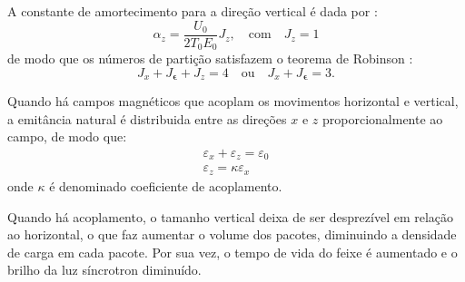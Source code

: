 A constante de amortecimento para a direção vertical é dada por \cite{Sands}:
\begin{equation}
 \alpha_z = \frac{U_0}{2T_0 E_0}J_z , \quad \text{com} \quad J_z = 1
\end{equation}
de modo que os números de partição satisfazem o teorema de Robinson \cite{Robinson}:
\begin{equation}
 J_x + J_{\boldsymbol{\epsilon}} + J_z = 4 \quad \text{ou} \quad J_x +
J_{\boldsymbol{\epsilon}} = 3.
\end{equation}

Quando há campos magnéticos que acoplam os movimentos horizontal e vertical, a emitância natural é distribuida entre as direções $x$ e $z$ proporcionalmente ao campo, de modo que:
\begin{eqnarray}
& \varepsilon_x + \varepsilon_z = \varepsilon_0 & \\
& \varepsilon_z = \kappa \varepsilon_x
\end{eqnarray}
onde $\kappa$ é denominado coeficiente de acoplamento.

Quando há acoplamento, o tamanho vertical deixa de ser desprezível em relação ao horizontal, o que faz aumentar o volume dos pacotes, diminuindo a densidade de carga em cada pacote. Por sua vez, o tempo de vida do feixe é aumentado e o brilho da luz síncrotron diminuído.
